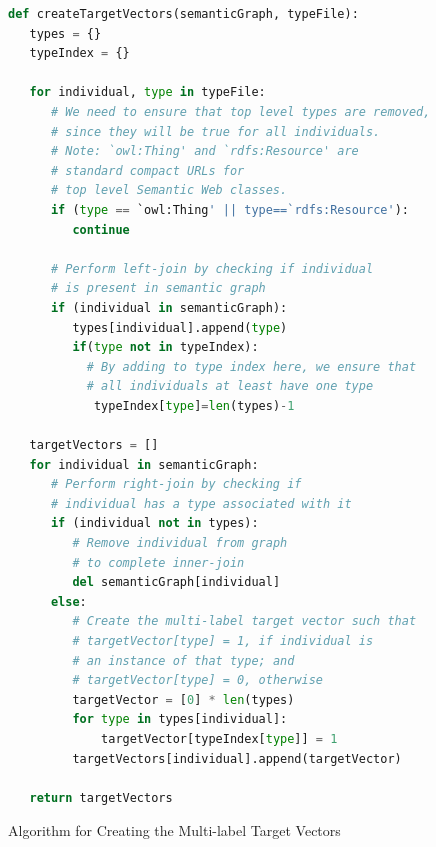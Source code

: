 \documentclass[runningheads,a4paper]{IEEEtran}
\begin{document}
\begin{figure}[t]
\begin{lstlisting}[language=Python,basicstyle=\scriptsize, frame=single]
def createTargetVectors(semanticGraph, typeFile):
   types = {}
   typeIndex = {}

   for individual, type in typeFile:
      # We need to ensure that top level types are removed, 
      # since they will be true for all individuals.
      # Note: `owl:Thing' and `rdfs:Resource' are 
      # standard compact URLs for 
      # top level Semantic Web classes.
      if (type == `owl:Thing' || type==`rdfs:Resource'):
         continue
      
      # Perform left-join by checking if individual 
      # is present in semantic graph
      if (individual in semanticGraph):
         types[individual].append(type)
         if(type not in typeIndex):
           # By adding to type index here, we ensure that 
           # all individuals at least have one type
            typeIndex[type]=len(types)-1

   targetVectors = []
   for individual in semanticGraph:
      # Perform right-join by checking if 
      # individual has a type associated with it
      if (individual not in types):
         # Remove individual from graph
         # to complete inner-join
         del semanticGraph[individual]
      else:
         # Create the multi-label target vector such that
         # targetVector[type] = 1, if individual is 
         # an instance of that type; and 
         # targetVector[type] = 0, otherwise
         targetVector = [0] * len(types)
         for type in types[individual]:
             targetVector[typeIndex[type]] = 1
         targetVectors[individual].append(targetVector)

   return targetVectors
\end{lstlisting}
\caption{Algorithm for Creating the Multi-label Target Vectors}
\label{createTargetVectors}
\end{figure}
\end{document}
